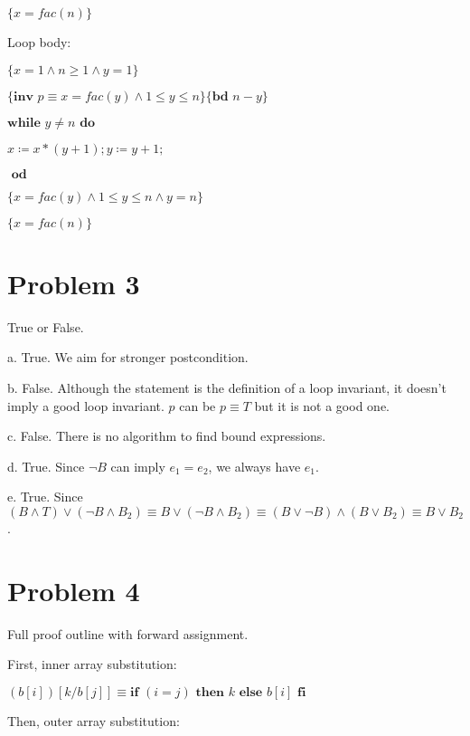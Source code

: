 \documentclass{article}
\begin{document}
$\{x=fac(n)\}$

\vspace{10pt}
Loop body:
\vspace{10pt}

$\{x=1 \wedge n \geq 1 \wedge y=1 \}$

$\{\textbf{inv }p \equiv x=fac(y) \wedge 1 \leq y \leq n \}\{\textbf{bd } n-y\}$

$ \textbf{while } y \neq n \textbf{ do }$

\qquad \qquad $x \coloneqq x*(y+1); y \coloneqq y+1;$

$\textbf{ od}$

$\{x=fac(y) \wedge 1 \leq y \leq n \wedge y=n\}$

$\{x=fac(n)\}$


\section*{Problem 3}

True or False.

\vspace{10pt}

a. True. We aim for stronger postcondition.

b. False. Although the statement is the definition of a loop invariant, it doesn't imply a good loop invariant. $p$ can be $p \equiv T$ but it is not a good one.

c. False. There is no algorithm to find bound expressions.

d. True. Since $\neg B$ can imply $e_1=e_2$, we always have $e_1$.

e. True. Since $ (B \wedge T) \vee (\neg B \wedge B_2) \equiv B \vee (\neg B \wedge B_2) \equiv (B \vee \neg B) \wedge (B \vee B_2) \equiv B \vee B_2$.


\section*{Problem 4}

Full proof outline with forward assignment.

\vspace{10pt}

First, inner array substitution:

$ (b[i])[k/b[j]] \equiv \textbf{if } (i=j) \textbf{ then } k \textbf{ else } b[i] \textbf{ fi} $

\vspace{10pt}
Then, outer array substitution:
\end{document}

